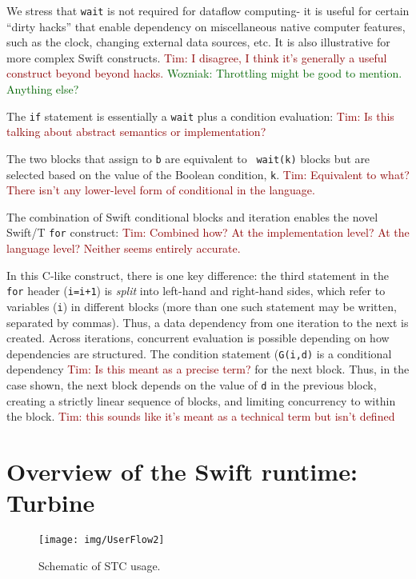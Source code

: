 \documentclass[conference,10pt]{IEEEtran}
\newcommand{\woz}[1]{ {\textcolor{darkgreen} { Wozniak: #1 }}}
\newcommand{\arm}[1]{ {\textcolor{darkred} { Tim: #1 }}}
\newcommand{\woz}[1]{}
\newcommand{\arm}[1]{}
\begin{document}
We stress that {\tt wait} is not required for dataflow computing- it
is useful for certain ``dirty hacks'' that enable dependency on
miscellaneous native computer features, such as the clock, changing
external data sources, etc.  It is also illustrative for more complex
Swift constructs.  \arm{I disagree, I think it's generally a useful
construct beyond beyond hacks.} \woz{Throttling might be good to
  mention.  Anything else?}

The {\tt if} statement is essentially a {\tt wait} plus a condition
evaluation:
\arm{Is this talking about abstract semantics or implementation?}

The two blocks that assign to {\tt b} are equivalent to {\tt
  wait(k)} blocks but are selected based on the value of the Boolean
condition, {\tt k}. \arm{Equivalent to what?  There isn't
any lower-level form of conditional in the language.}

The combination of Swift conditional blocks and iteration enables the
novel Swift/T {\tt for} construct: 
 \arm{Combined how? At the implementation level? At the language level?
    Neither seems entirely accurate.}

In this C-like construct, there is one key difference: the third
statement in the {\tt for} header ({\tt i=i+1}) is \emph{split} into
left-hand and right-hand sides, which refer to variables ({\tt i}) in
different blocks (more than one such statement may be written,
separated by commas).  Thus, a data dependency from one iteration
to the next is created.  Across iterations, concurrent evaluation is
possible depending on how dependencies are structured.  The condition
statement ({\tt G(i,d)} is a conditional dependency \arm{Is this meant
as a precise term?} for the next 
block.  Thus, in the case shown, the next block depends on the
value of {\tt d} in the previous block, creating a strictly linear
sequence of blocks, and limiting concurrency to within the
block. 
\arm{this sounds like it's meant as a technical term but isn't
defined}


\section{Overview of the Swift runtime: Turbine}
\label{section:turbine}

\begin{figure}[h]
  \begin{center}
    \texttt{[image: img/UserFlow2]}
    \caption{Schematic of STC usage. 
      \label{figure:userflow}}
  \end{center}
\end{figure}
\end{document}
